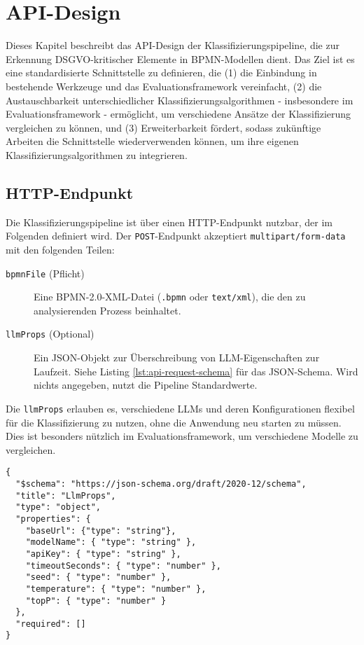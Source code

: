 \section{API-Design}\label{sec:api-design}

Dieses Kapitel beschreibt das API-Design der Klassifizierungspipeline, die zur Erkennung \ac{DSGVO}-kritischer Elemente in \ac{BPMN}-Modellen dient. Das Ziel ist es eine standardisierte Schnittstelle zu definieren, die (1) die Einbindung in bestehende Werkzeuge und das Evaluationsframework vereinfacht, (2) die Austauschbarkeit unterschiedlicher Klassifizierungsalgorithmen - insbesondere im Evaluationsframework - ermöglicht, um verschiedene Ansätze der Klassifizierung vergleichen zu können, und (3) Erweiterbarkeit fördert, sodass zukünftige Arbeiten die Schnittstelle wiederverwenden können, um ihre eigenen Klassifizierungsalgorithmen zu integrieren.

\subsection*{HTTP-Endpunkt}

Die Klassifizierungspipeline ist über einen HTTP-Endpunkt nutzbar, der im Folgenden definiert wird. Der \texttt{POST}-Endpunkt akzeptiert \texttt{multipart/form-data} mit den folgenden Teilen:

\begin{description}
    \item[\texttt{bpmnFile} (Pflicht)] Eine BPMN-2.0-XML-Datei (\texttt{.bpmn} oder \texttt{text/xml}), die den zu analysierenden Prozess beinhaltet.
    \item[\texttt{llmProps} (Optional)] Ein JSON-Objekt zur Überschreibung von \ac{LLM}-Eigenschaften zur Laufzeit. Siehe Listing \ref{lst:api-request-schema} für das JSON-Schema. Wird nichts angegeben, nutzt die Pipeline Standardwerte.
\end{description}

Die \texttt{llmProps} erlauben es, verschiedene \acp{LLM} und deren Konfigurationen flexibel für die Klassifizierung zu nutzen, ohne die Anwendung neu starten zu müssen. Dies ist besonders nützlich im Evaluationsframework, um verschiedene Modelle zu vergleichen.

\begin{lstlisting}[caption={JSON-Schema der \texttt{llmProps}.},label={lst:api-request-schema}]
{
  "$schema": "https://json-schema.org/draft/2020-12/schema",
  "title": "LlmProps",
  "type": "object",
  "properties": {
    "baseUrl": {"type": "string"},
    "modelName": { "type": "string" },
    "apiKey": { "type": "string" },
    "timeoutSeconds": { "type": "number" },
    "seed": { "type": "number" },
    "temperature": { "type": "number" },
    "topP": { "type": "number" }
  },
  "required": []
}
\end{lstlisting}

